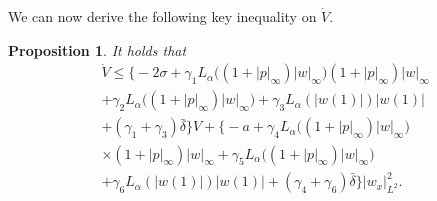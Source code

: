 \documentclass[twocolumn]{autart}
\newtheorem{propo}{Proposition}
\newenvironment{proposition}{\begin{propo}}{\hfill   \end{propo}}
\begin{document}
We can now derive the following key inequality on $\dot{V}$. 
\begin{proposition}
It holds that 
\begin{align}
&\dot{V} \leq \bigg\{ -2\sigma + \gamma_1 L_{\alpha}\bigg((1+|p|_{\infty})|w|_{\infty}\bigg)(1+|p|_{\infty})|w|_{\infty} \nonumber \\
&+ \gamma_2L_{\alpha}\bigg((1+|p|_{\infty})|w|_{\infty}\bigg) + \gamma_3L_{\alpha}(|w(1)|)|w(1)| \nonumber \\
&+ (\gamma_1+\gamma_3)\bar{\delta}\bigg\}V +\bigg\{-a + \gamma_4L_{\alpha}\bigg((1+|p|_{\infty})|w|_{\infty}\bigg) \nonumber \\
&\times (1+|p|_{\infty})|w|_{\infty} + \gamma_5L_{\alpha}\bigg((1+|p|_{\infty})|w|_{\infty}\bigg)  \nonumber \\
&+ \gamma_6L_{\alpha}(|w(1)|)|w(1)| + (\gamma_4+\gamma_6)\bar{\delta}\bigg\}|w_x|_{L^2}^2.   \label{To_Prove_1}
\end{align}
\hfill  
\end{proposition}
\end{document}
